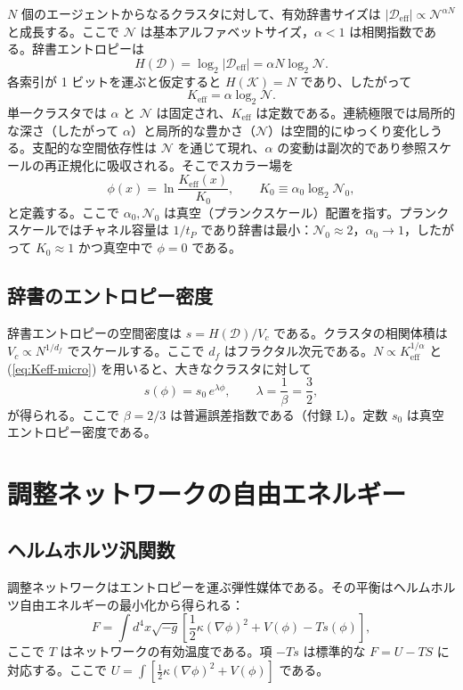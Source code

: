 \documentclass[12pt,a4paper]{article}
\newcommand{\Dir}{\mathcal{D}}
\begin{document}
	\(N\) 個のエージェントからなるクラスタに対して、有効辞書サイズは \(|\Dir_{\mathrm{eff}}| \propto \mathcal{N}^{\alpha N}\) と成長する。ここで \(\mathcal{N}\) は基本アルファベットサイズ，\(\alpha<1\) は相関指数である。辞書エントロピーは
	\[
	H(\Dir) = \log_2 |\Dir_{\mathrm{eff}}| = \alpha N \log_2 \mathcal{N}.
	\]
	各索引が 1 ビットを運ぶと仮定すると \(H(\mathcal{K}) = N\) であり、したがって
	\begin{equation}
		K_{\mathrm{eff}} = \alpha \log_2 \mathcal{N}. \label{eq:Keff-micro}
	\end{equation}
	単一クラスタでは \(\alpha\) と \(\mathcal{N}\) は固定され、\(K_{\mathrm{eff}}\) は定数である。連続極限では局所的な深さ（したがって \(\alpha\)）と局所的な豊かさ（\(\mathcal{N}\)）は空間的にゆっくり変化しうる。支配的な空間依存性は \(\mathcal{N}\) を通じて現れ、\(\alpha\) の変動は副次的であり参照スケールの再正規化に吸収される。そこでスカラー場を
	\begin{equation}
		\phi(x) = \ln \frac{K_{\mathrm{eff}}(x)}{K_0}, \qquad K_0 \equiv \alpha_0 \log_2 \mathcal{N}_0,
		\label{eq:phi-def}
	\end{equation}
	と定義する。ここで \(\alpha_0,\mathcal{N}_0\) は真空（プランクスケール）配置を指す。プランクスケールではチャネル容量は \(1/t_P\) であり辞書は最小：\(\mathcal{N}_0 \approx 2\)，\(\alpha_0 \rightarrow 1\)，したがって \(K_0 \approx 1\) かつ真空中で \(\phi=0\) である。
	
	\subsection{辞書のエントロピー密度}
	辞書エントロピーの空間密度は \(s = H(\Dir)/V_c\) である。クラスタの相関体積は \(V_c \propto N^{1/d_f}\) でスケールする。ここで \(d_f\) はフラクタル次元である。\(N \propto K_{\mathrm{eff}}^{1/\alpha}\) と (\ref{eq:Keff-micro}) を用いると、大きなクラスタに対して
	\begin{equation}
		s(\phi) = s_0\, e^{\lambda\phi}, \qquad \lambda = \frac{1}{\beta} = \frac{3}{2},
		\label{eq:s-phi}
	\end{equation}
	が得られる。ここで \(\beta = 2/3\) は普遍誤差指数である（付録 L）。定数 \(s_0\) は真空エントロピー密度である。
	
	\section{調整ネットワークの自由エネルギー}
	
	\subsection{ヘルムホルツ汎関数}
	調整ネットワークはエントロピーを運ぶ弾性媒体である。その平衡はヘルムホルツ自由エネルギーの最小化から得られる：
	\begin{equation}
		F = \int d^4x \sqrt{-g} \left[ \frac{1}{2}\kappa (\nabla\phi)^2 + V(\phi) - T s(\phi) \right],
		\label{eq:F}
	\end{equation}
	ここで \(T\) はネットワークの有効温度である。項 \(-Ts\) は標準的な \(F = U - TS\) に対応する。ここで \(U = \int [\frac12\kappa(\nabla\phi)^2 + V(\phi)]\) である。
	
\end{document}
